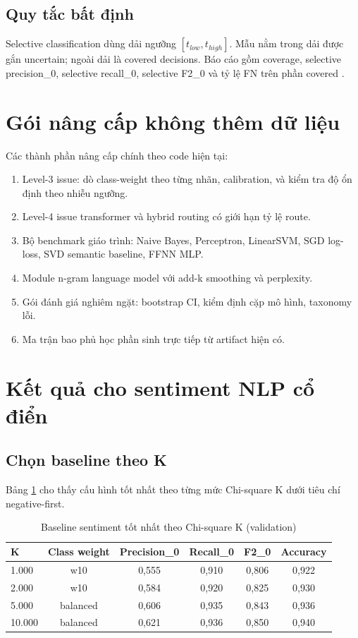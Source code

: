 ﻿\documentclass[12pt,a4paper]{article}
\begin{document}
\subsection{Quy tắc bất định}
Selective classification dùng dải ngưỡng \([t_{low}, t_{high}]\). Mẫu nằm trong dải được gắn uncertain; ngoài dải là covered decisions. Báo cáo gồm coverage, selective precision\_0, selective recall\_0, selective F2\_0 và tỷ lệ FN trên phần covered \cite{geifman2017}.

\section{Gói nâng cấp không thêm dữ liệu}
Các thành phần nâng cấp chính theo code hiện tại:
\begin{enumerate}
\item Level-3 issue: dò class-weight theo từng nhãn, calibration, và kiểm tra độ ổn định theo nhiễu ngưỡng.
\item Level-4 issue transformer và hybrid routing có giới hạn tỷ lệ route.
\item Bộ benchmark giáo trình: Naive Bayes, Perceptron, LinearSVM, SGD log-loss, SVD semantic baseline, FFNN MLP.
\item Module n-gram language model với add-k smoothing và perplexity.
\item Gói đánh giá nghiêm ngặt: bootstrap CI, kiểm định cặp mô hình, taxonomy lỗi.
\item Ma trận bao phủ học phần sinh trực tiếp từ artifact hiện có.
\end{enumerate}

\section{Kết quả cho sentiment NLP cổ điển}
\subsection{Chọn baseline theo K}
Bảng \ref{tab:chi2_k_vi} cho thấy cấu hình tốt nhất theo từng mức Chi-square K dưới tiêu chí negative-first.

\begin{table}[H]
\centering
\caption{Baseline sentiment tốt nhất theo Chi-square K (validation)}
\label{tab:chi2_k_vi}
\begin{tabular}{lccccc}
\toprule
K & Class weight & Precision\_0 & Recall\_0 & F2\_0 & Accuracy \\
\midrule
1.000 & w10 & 0,555 & 0,910 & 0,806 & 0,922 \\
2.000 & w10 & 0,584 & 0,920 & 0,825 & 0,930 \\
5.000 & balanced & 0,606 & 0,935 & 0,843 & 0,936 \\
10.000 & balanced & 0,621 & 0,936 & 0,850 & 0,940 \\
\bottomrule
\end{tabular}
\end{table}
\end{document}
